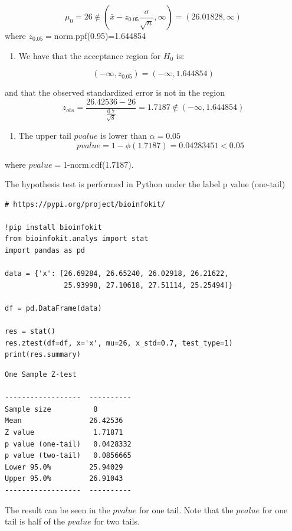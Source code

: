 \documentclass[
]{book}
\providecommand{\tightlist}{%
  \setlength{\itemsep}{0pt}\setlength{\parskip}{0pt}}
\begin{document}
\[\mu_0=26 \notin (\bar{x}-z_{0.05} \frac{\sigma}{\sqrt{n}}, \infty)=(26.01828, \infty)\]
where \(z_{0.05}=\)norm.ppf(0.95)=1.644854

\begin{enumerate}
\def\labelenumi{\arabic{enumi}.}
\setcounter{enumi}{1}
\tightlist
\item
  We have that the acceptance region for \(H_0\) is:
\end{enumerate}

\[(-\infty, z_{0.05})=( -\infty,  1.644854)\]

and that the observed standardized error is not in the region
\[z_{obs} =  \frac{26.42536-26}{\frac{0.7}{\sqrt{8}}}=1.7187 \notin ( -\infty,  1.644854)\]

\begin{enumerate}
\def\labelenumi{\arabic{enumi}.}
\setcounter{enumi}{2}
\tightlist
\item
  The upper tail \(pvalue\) is lower than \(\alpha=0.05\)
  \[pvalue=1-\phi(1.7187)=0.04283451 <0.05\]
\end{enumerate}

where \(pvalue=\)1-norm.cdf(1.7187).

The hypothesis test is performed in Python under the label p value (one-tail)

\begin{verbatim}
# https://pypi.org/project/bioinfokit/

!pip install bioinfokit
from bioinfokit.analys import stat
import pandas as pd

data = {'x': [26.69284, 26.65240, 26.02918, 26.21622, 
              25.93998, 27.10618, 27.51114, 25.25494]}

df = pd.DataFrame(data)

res = stat()
res.ztest(df=df, x='x', mu=26, x_std=0.7, test_type=1)
print(res.summary)
\end{verbatim}

\begin{verbatim}
One Sample Z-test 

------------------  ----------
Sample size          8
Mean                26.42536
Z value              1.71871
p value (one-tail)   0.0428332
p value (two-tail)   0.0856665
Lower 95.0%         25.94029
Upper 95.0%         26.91043
------------------  ----------
\end{verbatim}

The result can be seen in the \(pvalue\) for one tail. Note that the \(pvalue\) for one tail is half of the \(pvalue\) for two tails.
\end{document}
